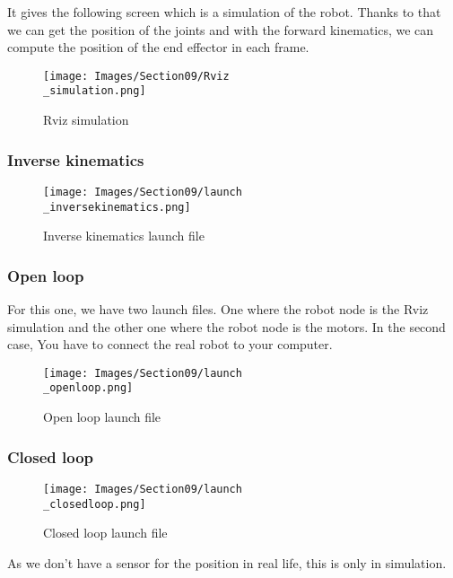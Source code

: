 It gives the following screen which is a simulation of the robot. Thanks to that we can get the position of the joints and with the forward kinematics, we can compute the position of the end effector in each frame.
\begin{figure}[ht]
    \centering
    \texttt{[image: Images/Section09/Rviz\\\_simulation.png]}
    \caption{Rviz simulation}
    \label{fig:RvizSim}
\end{figure}
\FloatBarrier

\subsubsection{Inverse kinematics}
\begin{figure}[ht]
    \centering
    \texttt{[image: Images/Section09/launch\\\_inversekinematics.png]}
    \caption{Inverse kinematics launch file}
    \label{fig:InverseKinLaunch}
\end{figure}
\FloatBarrier

\subsubsection{Open loop}

For this one, we have two launch files. One where the robot node is the Rviz simulation and the other one where the robot node is the motors. In the second case, You have to connect the real robot to your computer.

\begin{figure}[ht]
    \centering
    \texttt{[image: Images/Section09/launch\\\_openloop.png]}
    \caption{Open loop launch file}
    \label{fig:OpenLoopLaunch}
\end{figure}
\FloatBarrier

\subsubsection{Closed loop}
\begin{figure}[ht]
    \centering
    \texttt{[image: Images/Section09/launch\\\_closedloop.png]}
    \caption{Closed loop launch file}
    \label{fig:ClosedLoopLaunch}
\end{figure}
\FloatBarrier

\bigbreak
As we don't have a sensor for the position in real life, this is only in simulation.

